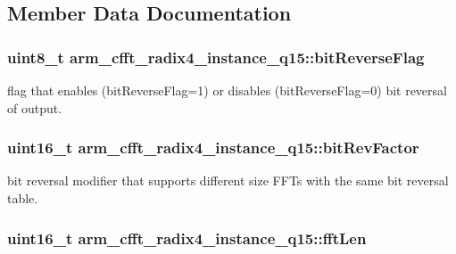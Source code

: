 \subsection{Member Data Documentation}
\hypertarget{structarm__cfft__radix4__instance__q15_a101e3f7b0bd6b5b14cd5214f23df4133}{
\subsubsection[{bit\-Reverse\-Flag}]{\setlength{\rightskip}{0pt plus 5cm}uint8\-\_\-t arm\-\_\-cfft\-\_\-radix4\-\_\-instance\-\_\-q15\-::bit\-Reverse\-Flag}}\label{structarm__cfft__radix4__instance__q15_a101e3f7b0bd6b5b14cd5214f23df4133}
flag that enables (bit\-Reverse\-Flag=1) or disables (bit\-Reverse\-Flag=0) bit reversal of output. \hypertarget{structarm__cfft__radix4__instance__q15_a6b010e5f02d1130c621e3d2e26b95df1}{
\subsubsection[{bit\-Rev\-Factor}]{\setlength{\rightskip}{0pt plus 5cm}uint16\-\_\-t arm\-\_\-cfft\-\_\-radix4\-\_\-instance\-\_\-q15\-::bit\-Rev\-Factor}}\label{structarm__cfft__radix4__instance__q15_a6b010e5f02d1130c621e3d2e26b95df1}
bit reversal modifier that supports different size F\-F\-Ts with the same bit reversal table. \hypertarget{structarm__cfft__radix4__instance__q15_a5fc543e7d84ca8cb7cf6648970f21ca6}{
\subsubsection[{fft\-Len}]{\setlength{\rightskip}{0pt plus 5cm}uint16\-\_\-t arm\-\_\-cfft\-\_\-radix4\-\_\-instance\-\_\-q15\-::fft\-Len}}\label{structarm__cfft__radix4__instance__q15_a5fc543e7d84ca8cb7cf6648970f21ca6}
